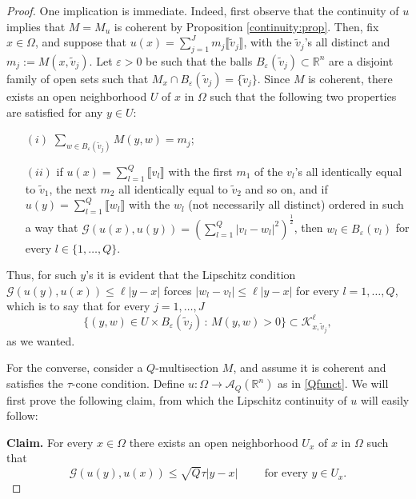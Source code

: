 \documentclass[a4paper,11pt,reqno]{amsart}
\theoremstyle{definition}
\numberwithin{equation}{section}
\numberwithin{subsection}{section}
\newcommand{\R}{\mathbb{R}}
\newcommand{\A}{\mathcal{A}}
\newcommand{\G}{\mathcal{G}}
\newcommand{\K}{\mathcal{K}}
\begin{document}
\begin{proof}
One implication is immediate. Indeed, first observe that the continuity of $u$ implies that $M = M_{u}$ is coherent by Proposition \ref{continuity:prop}. Then, fix $x \in \Omega$, and suppose that $u(x) = \sum_{j=1}^{J} m_{j} \llbracket \tilde{v}_{j} \rrbracket$, with the $\tilde{v}_{j}$'s all distinct and $m_{j} := M(x,\tilde{v}_{j})$. Let $\varepsilon > 0$ be such that the balls $B_{\varepsilon}(\tilde{v}_{j}) \subset \R^{n}$ are a disjoint family of open sets such that $M_{x} \cap B_{\varepsilon}(\tilde{v}_{j}) = \{\tilde{v}_{j}\}$. Since $M$ is coherent, there exists an open neighborhood $U$ of $x$ in $\Omega$ such that the following two properties are satisfied for any $y \in U$:
\begin{itemize}
\item[$(i)$] $\sum_{w \in B_{\varepsilon}(\tilde{v}_{j})} M(y,w) = m_{j}$;
\item[$(ii)$] if $u(x) = \sum_{l=1}^{Q} \llbracket v_{l} \rrbracket$ with the first $m_{1}$ of the $v_{l}$'s all identically equal to $\tilde{v}_{1}$, the next $m_{2}$ all identically equal to $\tilde{v}_{2}$ and so on, and if $u(y) = \sum_{l=1}^{Q} \llbracket w_{l} \rrbracket$ with the $w_{l}$ (not necessarily all distinct) ordered in such a way that $\G(u(x), u(y)) = \left( \sum_{l=1}^{Q} |v_{l} - w_{l}|^{2} \right)^{\frac{1}{2}}$, then $w_{l} \in B_{\varepsilon}(v_{l})$ for every $l \in \{1,\dots,Q\}$. 
\end{itemize} 
Thus, for such $y$'s it is evident that the Lipschitz condition $\G(u(y), u(x)) \leq \ell |y - x|$ forces $|w_{l} - v_{l}| \leq \ell |y - x|$ for every $l = 1,\dots,Q$, which is to say that for every $j = 1,\dots,J$
\[
\{ (y,w) \in U \times B_{\varepsilon}(\tilde{v}_{j}) \, \colon \, M(y,w) > 0 \} \subset \K^{\ell}_{x,\tilde{v}_{j}},
\] 
as we wanted.

For the converse, consider a $Q$-multisection $M$, and assume it is coherent and satisfies the $\tau$-cone condition. Define $u \colon \Omega \to \A_{Q}(\R^{n})$ as in \eqref{Qfunct}. We will first prove the following claim, from which the Lipschitz continuity of $u$ will easily follow:

\hspace*{0.5cm} \textbf{Claim.} For every $x \in \Omega$ there exists an open neighborhood $U_{x}$ of $x$ in $\Omega$ such that
\begin{equation} \label{claim}
\G(u(y), u(x)) \leq \sqrt{Q} \tau |y - x| \hspace{1cm} \mbox{for every } y \in U_{x}.
\end{equation} 


\end{proof}
\end{document}
